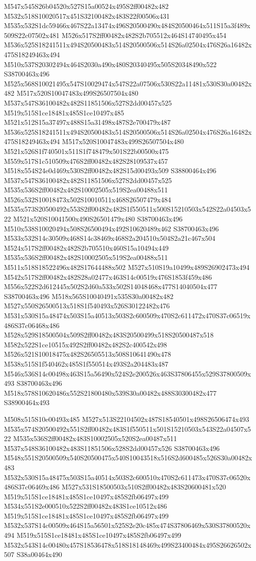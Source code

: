 \documentclass{article}
\begin{document}
\begin{multicols}{2}
M547x545S26b04520x527S15a00524x495S2ff00482x482 M532x518S10020517x451S32100482x483S22f00506x431 M535x532S1dc59466x467S22a13474x496S20500490x484S20500464x511S15a3f489x509S22c07502x481 M526x517S2ff00482x482S2b705512x464S14740495x454 M536x525S18241511x494S20500483x514S20500506x514S26a02504x476S26a16482x475S18249463x494 M510x537S20302494x464S2030a490x480S20340495x505S20348490x522 S38700463x496 M525x568S10021495x547S10029474x547S22a07506x530S22a11481x530S30a00482x482 M517x520S10047483x499S26507504x480 M537x547S36100482x482S11851506x527S2dd00457x525 M519x515S1ce18481x485S1ce10497x485 M521x512S15a37497x488S15a31498x487S2e700479x487 M536x525S18241511x494S20500483x514S20500506x514S26a02504x476S26a16482x475S18249463x494 M517x520S10047483x499S26507504x480 M521x526S1f740501x511S1f748479x501S22b00500x475 M559x517S1c510509x476S2ff00482x482S28109537x457 M518x554S24e0d469x530S2ff00482x482S15d00493x509 S38800464x496 M537x547S36100482x482S11851506x527S2dd00457x525 M535x536S2ff00482x482S10002505x519S2ea00488x511 M526x532S10018473x502S10010511x468S26507479x484 M535x573S20500492x553S2ff00482x482S1f550511x500S15210503x542S22a04503x522 M521x520S10041500x490S26501479x480 S38700463x496 M510x538S10020494x508S26500494x492S10620489x462 S38700463x496 M533x532S14c30509x468S14c38469x468S2a204510x504S2a21c467x504 M524x517S2ff00482x482S2b705510x460S15a10494x449 M535x536S2ff00482x482S10002505x519S2ea00488x511 M511x518S18522496x482S17644488x502 M527x510S19a10499x489S26902473x494 M542x517S2ff00482x482S28a02477x463S14c00519x476S1853f459x486 M556x522S2d612445x502S2d60a533x502S14048468x477S14040504x477 S38700463x496 M518x565S10040491x535S30a00482x482 M527x550S26500513x518S1f540493x526S30122482x476 M531x530S15a48474x503S15a40513x503S2c600509x470S2c611472x470S37c06519x486S37c06468x486 M528x529S18500504x509S2ff00482x483S20500499x518S20500487x518 M582x522S1ce10515x492S2ff00482x482S2c400542x498 M526x521S10018475x482S26505513x508S10641490x478 M538x515S1f540462x485S1f550514x493S2a204483x487 M546x536S14c00498x463S15a56490x524S2e200526x463S37806455x529S37800509x493 S38700463x496 M518x578S10620486x552S21800480x539S30a00482x488S30300482x477 S38900464x493

M508x515S10e00493x485 M527x513S22104502x487S18540501x498S26506474x493 M535x574S20500492x551S2ff00482x483S1f550511x501S15210503x543S22a04507x522 M535x536S2ff00482x483S10002505x520S2ea00487x511 M537x548S36100482x483S11851506x528S2dd00457x526 S38700463x496 M548x551S20500509x540S20500475x540S10043518x516S2d600485x526S30a00482x483 M532x530S15a48475x503S15a40514x503S2c600510x470S2c611473x470S37c06520x486S37c06469x486 M527x531S18500503x510S2ff00482x483S20600481x520 M519x515S1ce18481x485S1ce10497x485S2fb06497x499 M534x551S2e000510x522S2ff00482x483S1ce10512x486 M519x515S1ce18481x485S1ce10497x485S2fb06497x499 M532x537S14c00509x464S15a56501x525S2e20c485x474S37806469x530S37800520x494 M519x515S1ce18481x485S1ce10497x485S2fb06497x499 M532x543S14c00480x457S18536478x518S18148469x499S23400484x495S26626502x507 S38a00464x490


\end{multicols}
\end{document}
